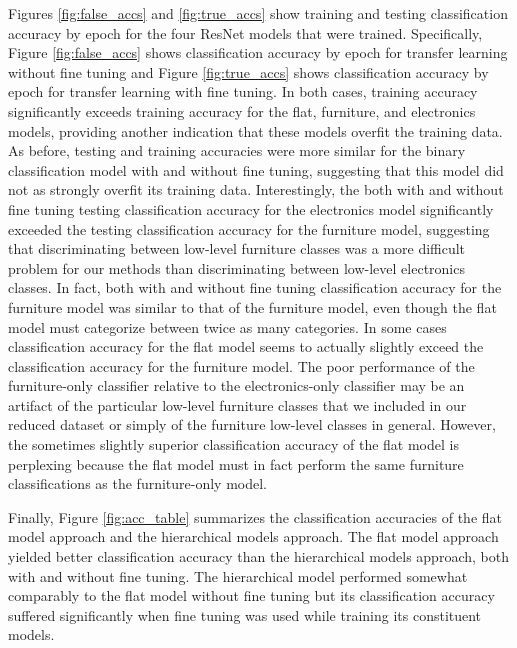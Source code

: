 Figures \ref{fig:false_accs} and \ref{fig:true_accs} show training and testing classification accuracy by epoch for the four ResNet models that were trained.
Specifically, Figure \ref{fig:false_accs} shows classification accuracy by epoch for transfer learning without fine tuning and Figure \ref{fig:true_accs} shows classification accuracy by epoch for transfer learning with fine tuning.
In both cases, training accuracy significantly exceeds training accuracy for the flat, furniture, and electronics models, providing another indication that these models overfit the training data. 
As before, testing and training accuracies were more similar for the binary classification model with and without fine tuning, suggesting that this model did not as strongly overfit its training data.
Interestingly, the both with and without fine tuning testing classification accuracy for the electronics model significantly exceeded the testing classification accuracy for the furniture model, suggesting that discriminating between low-level furniture classes was a more difficult problem for our methods than discriminating between low-level electronics classes.
In fact, both with and without fine tuning classification accuracy for the furniture model was similar to that of the furniture model, even though the flat model must categorize between twice as many categories.
In some cases classification accuracy for the flat model seems to actually slightly exceed the classification accuracy for the furniture model.
The poor performance of the furniture-only classifier relative to the electronics-only classifier may be an artifact of the particular low-level furniture classes that we included in our reduced dataset or simply of the furniture low-level classes in general.
However, the sometimes slightly superior classification accuracy of the flat model is perplexing because the flat model must in fact perform the same furniture classifications as the furniture-only model.

Finally, Figure \ref{fig:acc_table} summarizes the classification accuracies of the flat model approach and the hierarchical models approach.
The flat model approach yielded better classification accuracy than the hierarchical models approach, both with and without fine tuning.
The hierarchical model performed somewhat comparably to the flat model without fine tuning but its classification accuracy suffered significantly when fine tuning was used while training its constituent models.